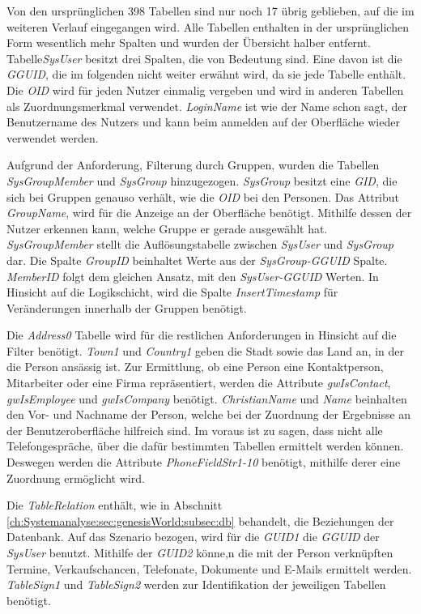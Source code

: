 Von den ursprünglichen 398 Tabellen sind nur noch 17 übrig geblieben, auf die im weiteren Verlauf eingegangen wird. Alle Tabellen enthalten in der ursprünglichen Form wesentlich mehr Spalten und wurden der Übersicht halber entfernt. Tabelle\textit{SysUser} besitzt drei Spalten, die von Bedeutung sind. Eine davon ist die \textit{GGUID}, die im folgenden nicht weiter erwähnt wird, da sie jede Tabelle enthält. Die \textit{OID} wird für jeden Nutzer einmalig vergeben und wird in anderen Tabellen als Zuordnungsmerkmal verwendet. \textit{LoginName} ist wie der Name schon sagt, der Benutzername des Nutzers und kann beim anmelden auf der Oberfläche wieder verwendet werden. 

Aufgrund der Anforderung, Filterung durch Gruppen, wurden die Tabellen \textit{SysGroupMember} und \textit{SysGroup} hinzugezogen. \textit{SysGroup} besitzt eine \textit{GID}, die sich bei Gruppen genauso verhält, wie die \textit{OID} bei den Personen. Das Attribut \textit{GroupName}, wird für die Anzeige an der Oberfläche benötigt. Mithilfe dessen der Nutzer erkennen kann, welche Gruppe er gerade ausgewählt hat. \textit{SysGroupMember} stellt die Auflösungstabelle zwischen \textit{SysUser} und \textit{SysGroup} dar. Die Spalte \textit{GroupID} beinhaltet Werte aus der \textit{SysGroup-GGUID} Spalte. \textit{MemberID} folgt dem gleichen Ansatz, mit den \textit{SysUser-GGUID} Werten. In Hinsicht auf die Logikschicht, wird die Spalte \textit{InsertTimestamp} für Veränderungen innerhalb der Gruppen benötigt.

Die \textit{Address0} Tabelle wird für die restlichen Anforderungen in Hinsicht auf die Filter benötigt. \textit{Town1} und \textit{Country1} geben die Stadt sowie das Land an, in der die Person ansässig ist. Zur Ermittlung, ob eine Person eine Kontaktperson, Mitarbeiter oder eine Firma repräsentiert, werden die Attribute \textit{gwIsContact}, \textit{gwIsEmployee} und \textit{gwIsCompany} benötigt. \textit{ChristianName} und \textit{Name} beinhalten den Vor- und Nachname der Person, welche bei der Zuordnung der Ergebnisse an der Benutzeroberfläche hilfreich sind. Im voraus ist zu sagen, dass nicht alle Telefongespräche, über die dafür bestimmten Tabellen ermittelt werden können. Deswegen werden die Attribute \textit{PhoneFieldStr1-10} benötigt, mithilfe derer eine Zuordnung ermöglicht wird. 

Die \textit{TableRelation} enthält, wie in Abschnitt \ref{ch:Systemanalyse:sec:genesisWorld:subsec:db} behandelt, die Beziehungen der Datenbank. Auf das Szenario bezogen, wird für die \textit{GUID1} die \textit{GGUID} der \textit{SysUser} benutzt. Mithilfe der \textit{GUID2} könne,n die mit der Person verknüpften Termine, Verkaufschancen, Telefonate, Dokumente und E-Mails ermittelt werden. \textit{TableSign1} und \textit{TableSign2} werden zur Identifikation der jeweiligen Tabellen benötigt.

